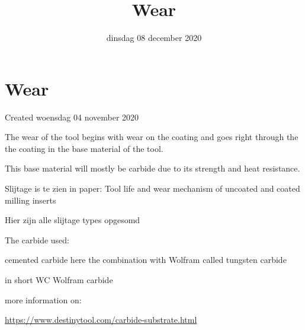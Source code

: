 \documentclass{scrartcl}
\title{Wear}
\date{dinsdag 08 december 2020}
\author{}
\begin{document}
\maketitle

		\section{Wear}

Created woensdag 04 november 2020



The wear of the tool begins with wear on the coating and goes right through the the coating in the base material of the tool. 

This base material will mostly be carbide due to its strength and heat resistance. 

	Slijtage is te zien in paper: Tool life and wear mechanism of uncoated and coated milling inserts
	
	Hier zijn alle slijtage types opgesomd
	
	

	The carbide used:
	
		cemented carbide here the combination with Wolfram called tungsten carbide
		
		in short WC Wolfram carbide
		
		

		more information on:
		
			\href{https://www.destinytool.com/carbide-substrate.html}{https://www.destinytool.com/carbide-substrate.html}
			
			



	
\end{document}
